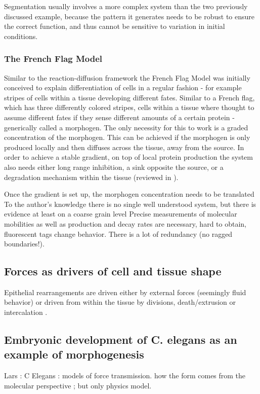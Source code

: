 \documentclass[fleqn,10pt]{wlscirep}
\begin{document}
Segmentation usually involves a more complex system than the two previously discussed example, because the pattern it generates needs to be robust to ensure the correct function, and thus cannot be sensitive to variation in initial conditions. 

\subsubsection*{The French Flag Model}
Similar to the reaction-diffusion framework the French Flag Model was initially conceived to explain differentiation of cells in a regular fashion - for example stripes of cells within a tissue developing different fates. Similar to a French flag, which has three differently colored stripes, cells within a tissue where thought to assume different fates if they sense different amounts of a certain protein - generically called a morphogen. The only necessity for this to work is a graded concentration of the morphogen. This can be achieved if the morphogen is only produced locally and then diffuses across the tissue, away from the source. In order to achieve a stable gradient, on top of local protein production the system also needs either long range inhibition, a sink opposite the source, or a degradation mechanism within the tissue (reviewed in \cite{wolpert2011}).

Once the gradient is set up, the morphogen concentration needs to be translated 
To the author's knowledge there is no single well understood system, but there is evidence at least on a coarse grain level \cite{wolpert2011}
Precise measurements of molecular mobilities as well as production and decay rates are necessary, hard to obtain, fluorescent tags change behavior.
There is a lot of redundancy (no ragged boundaries!).
\subsection*{Forces as drivers of cell and tissue shape}
Epithelial rearrangements are driven either by external forces (seemingly fluid behavior) or driven from within the tissue by divisions, death/extrusion or intercalation \cite{Guillot2013}.

\subsection*{Embryonic development of C. elegans as an example of morphogenesis}
Lars : C Elegans : models of force transmission. how the form comes from the molecular perspective ; but only physics model.
\end{document}
